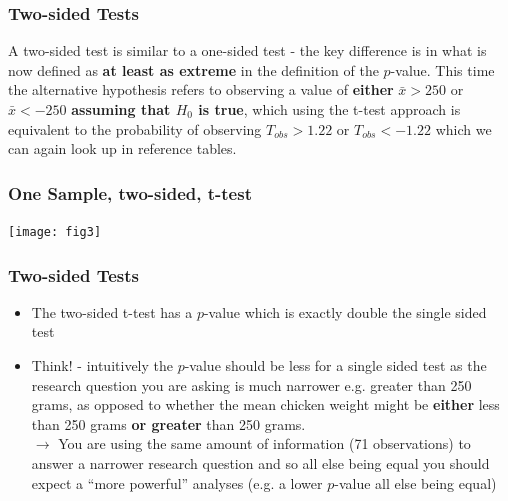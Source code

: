 \documentclass{beamer}\usepackage[]{graphicx}\usepackage[]{color}
\begin{document}
{{{%

\usebackgroundtemplate{}
\begin{frame}
\frametitle{Two-sided Tests}
\vspace{0.2cm}
A two-sided test is similar to a one-sided test - the key difference is in what
is now defined as {\bfseries at least as extreme} in the definition of the $p$-value.
This time the alternative hypothesis refers to observing a value of
{\bfseries either} $\bar{x}>250$ or $\bar{x}< -250$ {\bfseries assuming that $H_0$ is true},
which using the t-test approach is equivalent to the probability of observing
$T_{obs}>1.22$ or $T_{obs}<-1.22$ which we can again look up in reference tables.
\vspace{0.2cm}
\end{frame}


\begin{frame}
\frametitle{One Sample, two-sided, t-test}
\texttt{[image: fig3]}
\end{frame}


\begin{frame}
\frametitle{Two-sided Tests}
\begin{itemize}
\item The two-sided t-test has a $p$-value which is exactly double the single
sided test
\item Think! - intuitively the $p$-value should be less for a single sided test
as the research question you are asking is much narrower e.g. greater than
250 grams, as opposed to whether the mean chicken weight might be {\bfseries either}
less than 250 grams {\bfseries or greater} than 250 grams.\\
\vspace{0.2cm}
$\rightarrow$ You are using the same amount of information (71 observations)
to answer a narrower research question and so all else being equal you should
expect a ``more powerful'' analyses (e.g. a lower $p$-value all else being equal)
\end{itemize}
\end{frame}


}}}
\end{document}
